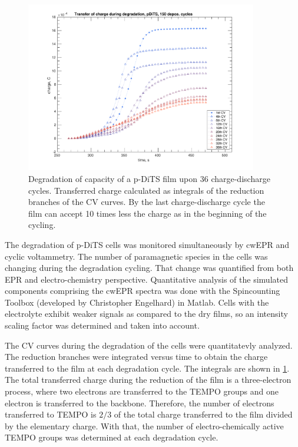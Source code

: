 \begin{figure}[ht!]
\includegraphics[width=0.9\textwidth]{./operando_epr/figures/degradation/Figure_S10}
\caption{Degradation of capacity of a p-DiTS film upon 36 charge-discharge cycles. Transferred charge calculated as integrals of the reduction branches of the CV curves. By the last charge-discharge cycle the film can accept 10 times less the charge as in the beginning of the cycling.}
\label{fig:S10}
\end{figure}


The degradation of p-DiTS cells was monitored simultaneously by cwEPR and cyclic voltammetry. The number of paramagnetic species in the cells was changing during the degradation cycling. That change was quantified from both EPR and electro-chemistry perspective. Quantitative analysis of the simulated components comprising the cwEPR spectra was done with the Spincounting Toolbox\cite{spin_counting_tb} (developed by Christopher Engelhard) in Matlab. Cells with the electrolyte exhibit weaker signals as compared to the dry films, so an intensity scaling factor was determined and taken into account.

\bigbreak

The CV curves during the degradation of the cells were quantitatevly analyzed. The reduction branches were integrated versus time to obtain the charge transferred to the film at each degradation cycle. The integrals are shown in \ref{fig:S10}. The total transferred charge during the reduction of the film is a three-electron process,\cite{si_vereshchagin2020} where two electrons are transferred to the TEMPO groups and one electron is transferred to the backbone. Therefore, the number of electrons transferred to TEMPO is $2/3$ of the total charge transferred to the film divided by the elementary charge. With that, the number of electro-chemically active TEMPO groups was determined at each degradation cycle.

